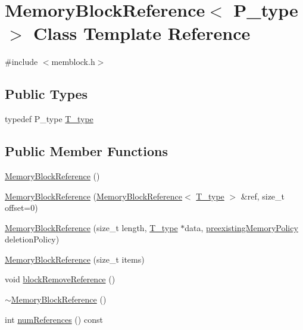\hypertarget{classMemoryBlockReference}{}\section{Memory\+Block\+Reference$<$ P\+\_\+type $>$ Class Template Reference}
\label{classMemoryBlockReference}


{\ttfamily \#include $<$memblock.\+h$>$}

\subsection*{Public Types}
\begin{DoxyCompactItemize}
\item 
typedef P\+\_\+type \hyperlink{classMemoryBlockReference_abf67312980afa9874edcdacc5d3f3eb3}{T\+\_\+type}
\end{DoxyCompactItemize}
\subsection*{Public Member Functions}
\begin{DoxyCompactItemize}
\item 
\hyperlink{classMemoryBlockReference_a60dea46292bf937fcd039e4ac4388dc1}{Memory\+Block\+Reference} ()
\item 
\hyperlink{classMemoryBlockReference_a5455d62955ba2ce9c222eeddb6828e98}{Memory\+Block\+Reference} (\hyperlink{classMemoryBlockReference}{Memory\+Block\+Reference}$<$ \hyperlink{classMemoryBlockReference_abf67312980afa9874edcdacc5d3f3eb3}{T\+\_\+type} $>$ \&ref, size\+\_\+t offset=0)
\item 
\hyperlink{classMemoryBlockReference_a3e6f35c312d9816d258062dd8cb9cef4}{Memory\+Block\+Reference} (size\+\_\+t length, \hyperlink{classMemoryBlockReference_abf67312980afa9874edcdacc5d3f3eb3}{T\+\_\+type} $\ast$data, \hyperlink{memblock_8h_ae9323b8f2afbf31c869a1610053247db}{preexisting\+Memory\+Policy} deletion\+Policy)
\item 
\hyperlink{classMemoryBlockReference_ad894720130c2d5a340681c0bd86e9cb4}{Memory\+Block\+Reference} (size\+\_\+t items)
\item 
void \hyperlink{classMemoryBlockReference_a733bb94fe509f71ae8842cf788b8d434}{block\+Remove\+Reference} ()
\item 
\hyperlink{classMemoryBlockReference_aa76996b8ab86fd43c2da3624eb945a60}{$\sim$\+Memory\+Block\+Reference} ()
\item 
int \hyperlink{classMemoryBlockReference_a3aa545876fa5afe5217108d952113b88}{num\+References} () const 
\end{DoxyCompactItemize}
